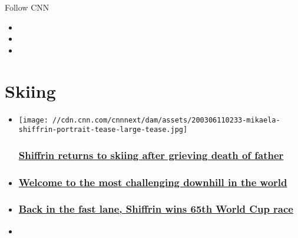 Follow CNN

\begin{itemize}
\item
\item
\item
\end{itemize}

\hypertarget{skiing}{%
\section{Skiing}\label{skiing}}

\begin{itemize}
\item
  \href{/2020/03/06/sport/mikaela-shiffrin-father-death-skiing-world-cup-spt-intl/index.html}{}

  \texttt{[image: //cdn.cnn.com/cnnnext/dam/assets/200306110233-mikaela-shiffrin-portrait-tease-large-tease.jpg]}

  \hypertarget{shiffrin-returns-to-skiing-after-grieving-death-of-father}{%
  \subsubsection{\texorpdfstring{\href{/2020/03/06/sport/mikaela-shiffrin-father-death-skiing-world-cup-spt-intl/index.html}{Shiffrin
  returns to skiing after grieving death of
  father}}{Shiffrin returns to skiing after grieving death of father}}\label{shiffrin-returns-to-skiing-after-grieving-death-of-father}}
\item
  \hypertarget{welcome-to-the-most-challenging-downhill-in-the-world}{%
  \subsubsection{\texorpdfstring{\href{/2019/01/25/sport/kitzbuhel-skiing-downhill-hahnenkamm-world-cup-spt-intl/index.html}{Welcome
  to the most challenging downhill in the
  world}}{Welcome to the most challenging downhill in the world}}\label{welcome-to-the-most-challenging-downhill-in-the-world}}
\item
  \hypertarget{back-in-the-fast-lane-shiffrin-wins-65th-world-cup-race}{%
  \subsubsection{\texorpdfstring{\href{/2020/01/24/sport/mikaela-shiffrin-world-cup-skiing-bansko-downhill-spt-intl/index.html}{Back
  in the fast lane, Shiffrin wins 65th World Cup
  race}}{Back in the fast lane, Shiffrin wins 65th World Cup race}}\label{back-in-the-fast-lane-shiffrin-wins-65th-world-cup-race}}
\item
  \hypertarget{dual-olympic-champion-ester-ledecka-wins-first-world-cup-skiing-race}{%
}
\end{itemize}
